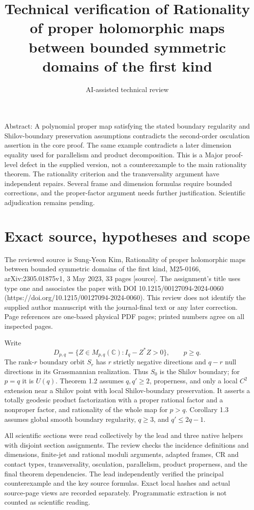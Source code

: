 \documentclass[10pt]{article}
\title{Technical verification of Rationality of proper holomorphic maps between bounded symmetric domains of the first kind}
\author{AI-assisted technical review}
\date{}
\begin{document}
\maketitle
Abstract: A polynomial proper map satisfying the stated boundary regularity and Shilov-boundary preservation assumptions contradicts the second-order osculation assertion in the core proof. The same example contradicts a later dimension equality used for parallelism and product decomposition. This is a Major proof-level defect in the supplied version, not a counterexample to the main rationality theorem. The rationality criterion and the transversality argument have independent repairs. Several frame and dimension formulas require bounded corrections, and the proper-factor argument needs further justification. Scientific adjudication remains pending.\par
\section*{Exact source, hypotheses and scope}
The reviewed source is Sung-Yeon Kim, Rationality of proper holomorphic maps between bounded symmetric domains of the first kind, M25-0166, arXiv:2305.01875v1, 3 May 2023, 33 pages [source]. The assignment’s title uses type one and associates the paper with DOI 10.1215/00127094-2024-0060 (https://doi.org/10.1215/00127094-2024-0060). This review does not identify the supplied author manuscript with the journal-final text or any later correction. Page references are one-based physical PDF pages; printed numbers agree on all inspected pages.\par
Write \[D_{p,q}=\{Z\in M_{p,q}(\mathbb C):I_q-Z^*Z>0\},\qquad p\ge q.\] The rank-\(r\) boundary orbit \(S_r\) has \(r\) strictly negative directions and \(q-r\) null directions in its Grassmannian realization. Thus \(S_0\) is the Shilov boundary; for \(p=q\) it is \(U(q)\). Theorem 1.2 assumes \(q,q'\ge2\), properness, and only a local \(C^2\) extension near a Shilov point with local Shilov-boundary preservation. It asserts a totally geodesic product factorization with a proper rational factor and a nonproper factor, and rationality of the whole map for \(p>q\). Corollary 1.3 assumes global smooth boundary regularity, \(q\ge3\), and \(q'\le2q-1\).\par
All scientific sections were read collectively by the lead and three native helpers with disjoint section assignments. The review checks the incidence definitions and dimensions, finite-jet and rational moduli arguments, adapted frames, CR and contact types, transversality, osculation, parallelism, product properness, and the final theorem dependencies. The lead independently verified the principal counterexample and the key source formulas. Exact local hashes and actual source-page views are recorded separately. Programmatic extraction is not counted as scientific reading.\par
\end{document}
